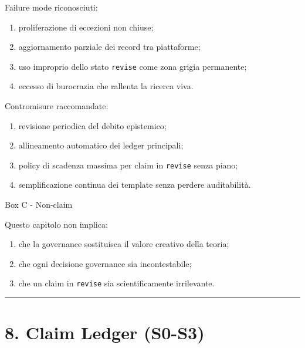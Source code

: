 Failure mode riconosciuti:

\begin{enumerate}
\def\labelenumi{\arabic{enumi}.}
\tightlist
\item
  proliferazione di eccezioni non chiuse;
\item
  aggiornamento parziale dei record tra piattaforme;
\item
  uso improprio dello stato \texttt{revise} come zona grigia permanente;
\item
  eccesso di burocrazia che rallenta la ricerca viva.
\end{enumerate}

Contromisure raccomandate:

\begin{enumerate}
\def\labelenumi{\arabic{enumi}.}
\tightlist
\item
  revisione periodica del debito epistemico;
\item
  allineamento automatico dei ledger principali;
\item
  policy di scadenza massima per claim in \texttt{revise} senza piano;
\item
  semplificazione continua dei template senza perdere auditabilità.
\end{enumerate}

Box C - Non-claim

Questo capitolo non implica:

\begin{enumerate}
\def\labelenumi{\arabic{enumi}.}
\tightlist
\item
  che la governance sostituisca il valore creativo della teoria;
\item
  che ogni decisione governance sia incontestabile;
\item
  che un claim in \texttt{revise} sia scientificamente irrilevante.
\end{enumerate}

\begin{center}\rule{0.5\linewidth}{0.5pt}\end{center}

\section{8. Claim Ledger (S0-S3)}

